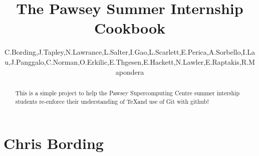 \documentclass[11pt,a4paper]{report}
\title{The Pawsey Summer Internship Cookbook}
\author{C.Bording,J.Tapley,N.Lawrance,L.Salter,I.Gao,L.Scarlett,E.Perica,A.Sorbello,I.Lau,J.Panggalo,C.Norman,O.Erkilic,E.Thgesen,E.Hackett,N.Lawler,E.Raptakis,R.Mapondera}
\begin{document}


\begin{abstract}

This is a simple project to help the Pawsey Supercomputing Centre summer intership students re-enforce their understanding of \TeX and use of Git with github!

\end{abstract}

\chapter{Chris Bording}

\end{document}
